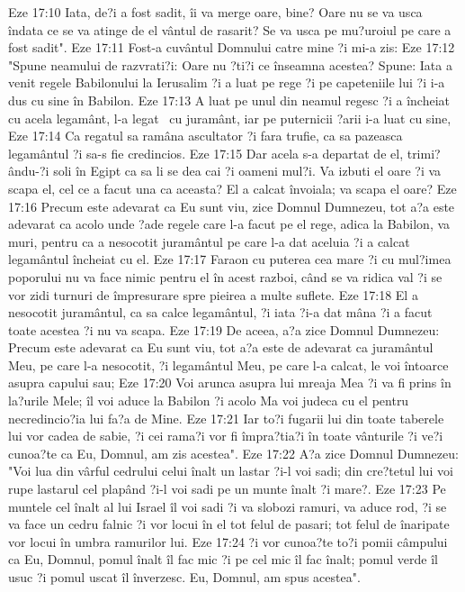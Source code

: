 Eze 17:10  Iata, de?i a fost sadit, îi va merge oare, bine? Oare nu se va usca îndata ce se va atinge de el vântul de rasarit? Se va usca pe mu?uroiul pe care a fost sadit".
Eze 17:11  Fost-a cuvântul Domnului catre mine ?i mi-a zis:
Eze 17:12  "Spune neamului de razvrati?i: Oare nu ?ti?i ce înseamna acestea? Spune: Iata a venit regele Babilonului la Ierusalim ?i a luat pe rege ?i pe capeteniile lui ?i i-a dus cu sine în Babilon.
Eze 17:13  A luat pe unul din neamul regesc ?i a încheiat cu acela legamânt, l-a legat  cu juramânt, iar pe puternicii ?arii i-a luat cu sine,
Eze 17:14  Ca regatul sa ramâna ascultator ?i fara trufie, ca sa pazeasca legamântul ?i sa-s fie credincios.
Eze 17:15  Dar acela s-a departat de el, trimi?ându-?i soli în Egipt ca sa li se dea cai ?i oameni mul?i. Va izbuti el oare ?i va scapa el, cel ce a facut una ca aceasta? El a calcat învoiala; va scapa el oare?
Eze 17:16  Precum este adevarat ca Eu sunt viu, zice Domnul Dumnezeu, tot a?a este adevarat ca acolo unde ?ade regele care l-a facut pe el rege, adica la Babilon, va muri, pentru ca a nesocotit juramântul pe care l-a dat aceluia ?i a calcat legamântul încheiat cu el.
Eze 17:17  Faraon cu puterea cea mare ?i cu mul?imea poporului nu va face nimic pentru el în acest razboi, când se va ridica val ?i se vor zidi turnuri de împresurare spre pieirea a multe suflete.
Eze 17:18  El a nesocotit juramântul, ca sa calce legamântul, ?i iata ?i-a dat mâna ?i a facut toate acestea ?i nu va scapa.
Eze 17:19  De aceea, a?a zice Domnul Dumnezeu: Precum este adevarat ca Eu sunt viu, tot a?a este de adevarat ca juramântul Meu, pe care l-a nesocotit, ?i legamântul Meu, pe care l-a calcat, le voi întoarce asupra capului sau;
Eze 17:20  Voi arunca asupra lui mreaja Mea ?i va fi prins în la?urile Mele; îl voi aduce la Babilon ?i acolo Ma voi judeca cu el pentru necredincio?ia lui fa?a de Mine.
Eze 17:21  Iar to?i fugarii lui din toate taberele lui vor cadea de sabie, ?i cei rama?i vor fi împra?tia?i în toate vânturile ?i ve?i cunoa?te ca Eu, Domnul, am zis acestea".
Eze 17:22  A?a zice Domnul Dumnezeu: "Voi lua din vârful cedrului celui înalt un lastar ?i-l voi sadi; din cre?tetul lui voi rupe lastarul cel plapând ?i-l voi sadi pe un munte înalt ?i mare?.
Eze 17:23  Pe muntele cel înalt al lui Israel îl voi sadi ?i va slobozi ramuri, va aduce rod, ?i se va face un cedru falnic ?i vor locui în el tot felul de pasari; tot felul de înaripate vor locui în umbra ramurilor lui.
Eze 17:24  ?i vor cunoa?te to?i pomii câmpului ca Eu, Domnul, pomul înalt îl fac mic ?i pe cel mic îl fac înalt; pomul verde îl usuc ?i pomul uscat îl înverzesc. Eu, Domnul, am spus acestea".
